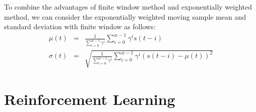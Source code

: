 \documentclass[10pt, twoside]{book}   	%
\begin{document}
To combine the advantages of finite window method and exponentially weighted method,
we can consider the exponentially weighted moving sample mean and standard deviation with finite window
as follows:
\begin{eqnarray}
\mu(t) &=& \frac{1}{\sum_{i=0}^{w-1} \gamma^i }\sum_{i=0}^{w-1} \gamma^i s(t-i)
\\
\sigma(t) &=& \sqrt{\frac{1}{\sum_{i=0}^{w-1} \gamma^i }\sum_{i=0}^{w-1} \gamma^i (s(t-i)-\mu(t))^2}
\end{eqnarray}


\chapter{Reinforcement Learning}



\iffalse
\appendix
\appendixpage
\addappheadtotoc


\chapter{Amazon Machine Learning University}



\fi
\end{document}

